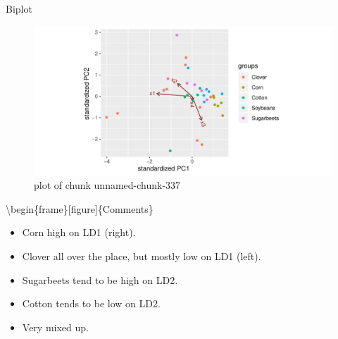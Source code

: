 \documentclass[ignorenonframetext,]{beamer}
\newenvironment{Shaded}{\begin{snugshade}}{\end{snugshade}}
\newcommand{\DataTypeTok}[1]{\textcolor[rgb]{0.13,0.29,0.53}{#1}}
\newcommand{\KeywordTok}[1]{\textcolor[rgb]{0.13,0.29,0.53}{\textbf{#1}}}
\newcommand{\NormalTok}[1]{#1}
\newcommand{\OperatorTok}[1]{\textcolor[rgb]{0.81,0.36,0.00}{\textbf{#1}}}
\begin{document}
\begin{frame}[fragile]{Biplot}
\protect\hypertarget{biplot-1}{}

\begin{Shaded}
\end{Shaded}

\begin{figure}
\centering
\includegraphics{figure/unnamed-chunk-337-1.pdf}
\caption{plot of chunk unnamed-chunk-337}
\end{figure}

\textbackslash{}begin\{frame\}{[}figure{]}\{Comments\}

\begin{itemize}
\item
  Corn high on LD1 (right).
\item
  Clover all over the place, but mostly low on LD1 (left).
\item
  Sugarbeets tend to be high on LD2.
\item
  Cotton tends to be low on LD2.
\item
  Very mixed up.
\end{itemize}

\end{frame}
\end{document}
